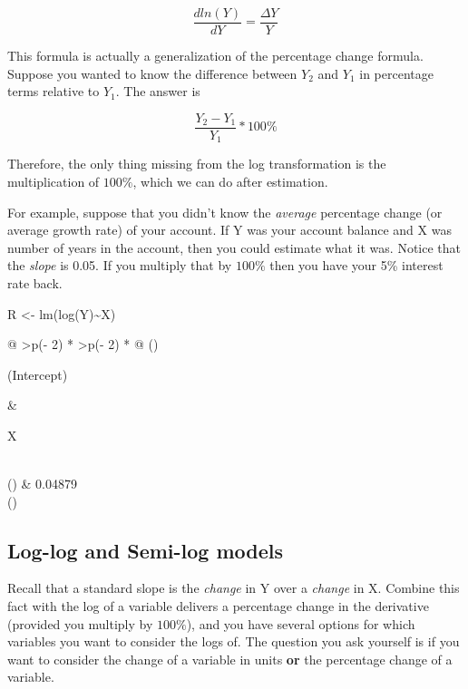 \documentclass[
]{book}
\newenvironment{Shaded}{\begin{snugshade}}{\end{snugshade}}
\newcommand{\FunctionTok}[1]{\textcolor[rgb]{0.00,0.00,0.00}{#1}}
\newcommand{\NormalTok}[1]{#1}
\newcommand{\OtherTok}[1]{\textcolor[rgb]{0.56,0.35,0.01}{#1}}
\newcommand{\SpecialCharTok}[1]{\textcolor[rgb]{0.00,0.00,0.00}{#1}}
\begin{document}
\[\frac{dln(Y)}{dY} = \frac{\Delta Y}{Y}\]

This formula is actually a generalization of the percentage change formula. Suppose you wanted to know the difference between \(Y_2\) and \(Y_1\) in percentage terms relative to \(Y_1\). The answer is

\[\frac{Y_2 - Y_1}{Y_1} * 100\%\]

Therefore, the only thing missing from the log transformation is the multiplication of \(100\%\), which we can do after estimation.

For example, suppose that you didn't know the \emph{average} percentage change (or average growth rate) of your account. If Y was your account balance and X was number of years in the account, then you could estimate what it was. Notice that the \emph{slope} is 0.05. If you multiply that by \(100\%\) then you have your 5\% interest rate back.

\begin{Shaded}
\begin{Highlighting}[]
\NormalTok{R }\OtherTok{\textless{}{-}} \FunctionTok{lm}\NormalTok{(}\FunctionTok{log}\NormalTok{(Y)}\SpecialCharTok{\textasciitilde{}}\NormalTok{X)}
\end{Highlighting}
\end{Shaded}

\begin{longtable}[]{@{}
  >{\centering\arraybackslash}p{(\columnwidth - 2\tabcolsep) * }
  >{\centering\arraybackslash}p{(\columnwidth - 2\tabcolsep) * }@{}}
\toprule()
\begin{minipage}[b]{\linewidth}\centering
(Intercept)
\end{minipage} & \begin{minipage}[b]{\linewidth}\centering
X
\end{minipage} \\
\midrule()
 & 0.04879 \\
\bottomrule()
\end{longtable}

\hypertarget{log-log-and-semi-log-models}{%
\subsection*{Log-log and Semi-log models}\label{log-log-and-semi-log-models}}

Recall that a standard slope is the \emph{change} in Y over a \emph{change} in X. Combine this fact with the log of a variable delivers a percentage change in the derivative (provided you multiply by \(100\%\)), and you have several options for which variables you want to consider the logs of. The question you ask yourself is if you want to consider the change of a variable in units \textbf{or} the percentage change of a variable.
\end{document}
